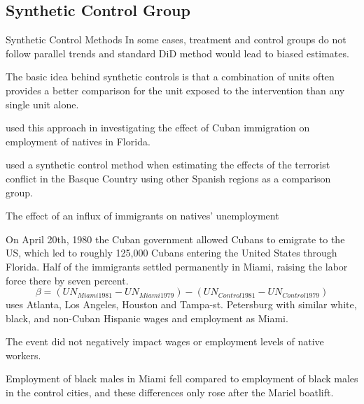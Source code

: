 \documentclass{beamer}
\begin{document}
\subsection{Synthetic Control Group}
\begin{frame}{Synthetic Control Methods}
In some cases, treatment and control groups do not follow parallel trends and standard DiD method would lead to biased estimates.\bigskip

The basic idea behind synthetic controls is that a combination of
units often provides a better comparison for the unit exposed to the intervention than any single unit alone.\bigskip

\cite{card1990impact} used this approach in investigating the effect of Cuban immigration on employment of natives in Florida.\medskip

\cite{abadie2003economic} used a synthetic control method when estimating the effects of the terrorist conflict in the Basque Country using other Spanish regions as a comparison group.

\end{frame}

\begin{frame}{\cite{card1990impact}}
The effect of an influx of immigrants on natives' unemployment\medskip

On April 20th, 1980 the Cuban government allowed Cubans to emigrate to the US, which led to roughly 125,000 Cubans entering the United States through Florida. 
Half of the immigrants settled permanently in Miami, raising the labor force there by seven percent.
\[ \beta=(UN_{Miami 1981}-UN_{Miami 1979})-(UN_{Control 1981}-UN_{Control 1979}) \]  
\cite{card1990impact} uses Atlanta, Los Angeles, Houston and Tampa-st. Petersburg with similar white, black, and non-Cuban Hispanic wages and employment as Miami.\medskip

The event did not negatively impact wages or employment levels of native workers.\medskip

Employment of black males in Miami fell compared to employment of black males in the control
cities, and these differences only rose after the Mariel boatlift.\medskip


\end{frame}
\end{document}
